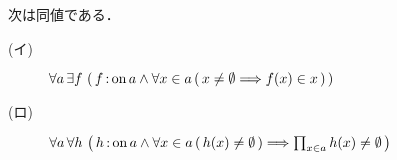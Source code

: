 	\begin{screen}
		\begin{thm}[選択公理と直積]
		\label{thm:direct_product_of_non_empty_sets_is_not_empty}
			次は同値である．
			\begin{description}
				\item[(イ)] $\forall a\, \exists f\, \left(\, f \operatorname*{:on} a \wedge \forall x \in a\, (\, x \neq \emptyset \Longrightarrow f(x) \in x\, )\, \right)$
				\item[(ロ)] $\forall a\, \forall h\, \left(\, h \operatorname*{:on} a \wedge \forall x \in a\, (\, h(x) \neq \emptyset\, )
				\Longrightarrow \prod_{x \in a} h(x) \neq \emptyset\, \right)$
			\end{description}
		\end{thm}
	\end{screen}
	
